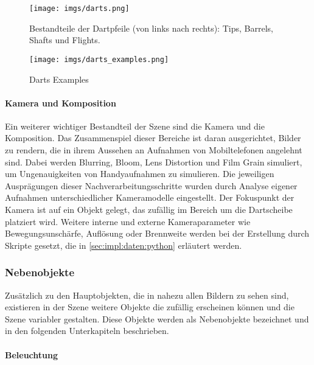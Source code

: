 \begin{figure}
    \centering
    \texttt{[image: imgs/darts.png]}
    \caption{Bestandteile der Dartpfeile (von links nach rechts): Tips, Barrels, Shafts und Flights.}
    \label{img:dartpfeil_teile}
\end{figure}

\begin{figure}
    \centering
    \texttt{[image: imgs/darts\_examples.png]}
    \caption{Darts Examples}
    \label{img:dart_examples}
\end{figure}

\paragraph{Kamera und Komposition}
\label{sec:impl:daten:blender:hauptobjekte:kamera}

Ein weiterer wichtiger Bestandteil der Szene sind die Kamera und die Komposition. Das Zusammenspiel dieser Bereiche ist daran ausgerichtet, Bilder zu rendern, die in ihrem Aussehen an Aufnahmen von Mobiltelefonen angelehnt sind. Dabei werden Blurring, Bloom, Lens Distortion und Film Grain simuliert, um Ungenauigkeiten von Handyaufnahmen zu simulieren. Die jeweiligen Ausprägungen dieser Nachverarbeitungsschritte wurden durch Analyse eigener Aufnahmen unterschiedlicher Kameramodelle eingestellt. Der Fokuspunkt der Kamera ist auf ein Objekt gelegt, das zufällig im Bereich um die Dartscheibe platziert wird. Weitere interne und externe Kameraparameter wie Bewegungsunschärfe, Auflösung oder Brennweite werden bei der Erstellung durch Skripte gesetzt, die in \autoref{sec:impl:daten:python} erläutert werden.

\subsubsection{Nebenobjekte}
\label{sec:impl:daten:blender:nebenobjekte}

Zusätzlich zu den Hauptobjekten, die in nahezu allen Bildern zu sehen sind, existieren in der Szene weitere Objekte die zufällig erscheinen können und die Szene variabler gestalten. Diese Objekte werden als Nebenobjekte bezeichnet und in den folgenden Unterkapiteln beschrieben.

\paragraph{Beleuchtung}
\label{sec:impl:daten:blender:nebenobjekte:licht}

